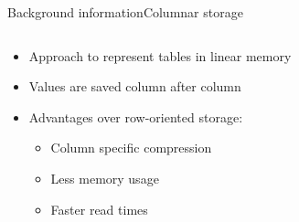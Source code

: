 \begin{frame}[t]{Background information}{Columnar storage}
	\begin{columns}[t]
		\begin{column}[t]{0.4\linewidth}
			\begin{itemize}
				\item Approach to represent tables in linear memory
				\item Values are saved column after column\footnotemark
				\item<2-> Advantages over row-oriented storage:
				      \begin{itemize}
					      \item Column specific compression\footnotemark
					      \item Less memory usage\footnotemark[2]
					      \item Faster read times\footnotemark[1]
				      \end{itemize}


\end{itemize}
\end{column}
\end{columns}
\end{frame}
